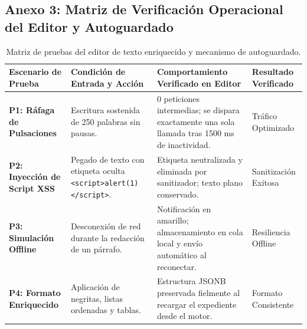 \documentclass[12pt,a4paper]{article}
\begin{document}
\subsection*{Anexo 3: Matriz de Verificación Operacional del Editor y Autoguardado}
\begin{table}[H]
\centering
\small
\renewcommand{\arraystretch}{1.15}
\begin{tabularx}{\textwidth}{|>{\hsize=0.75\hsize\raggedright\arraybackslash\bfseries\footnotesize}X|>{\hsize=1.25\hsize\raggedright\arraybackslash\footnotesize}X|>{\hsize=1.35\hsize\raggedright\arraybackslash\footnotesize}X|>{\hsize=0.65\hsize\centering\arraybackslash\footnotesize}X|}
\hline
\rowcolor{tableheader}
\textbf{Escenario de Prueba} & \textbf{Condición de Entrada y Acción} & \textbf{Comportamiento Verificado en Editor} & \textbf{Resultado Verificado} \\
\hline
P1: Ráfaga de Pulsaciones & Escritura sostenida de 250 palabras sin pausas. & 0 peticiones intermedias; se dispara exactamente una sola llamada tras 1500 ms de inactividad. & Tráfico Optimizado \\
\hline
P2: Inyección de Script XSS & Pegado de texto con etiqueta oculta \texttt{<script>alert(1)</\allowbreak  script>}. & Etiqueta neutralizada y eliminada por sanitizador; texto plano conservado. & Sanitización Exitosa \\
\hline
P3: Simulación Offline & Desconexión de red durante la redacción de un párrafo. & Notificación en amarillo; almacenamiento en cola local y envío automático al reconectar. & Resiliencia Offline \\
\hline
P4: Formato Enriquecido & Aplicación de negritas, listas ordenadas y tablas. & Estructura JSONB preservada fielmente al recargar el expediente desde el motor. & Formato Consistente \\
\hline
\end{tabularx}
\caption{Matriz de pruebas del editor de texto enriquecido y mecanismo de autoguardado.}
\end{table}
\end{document}
